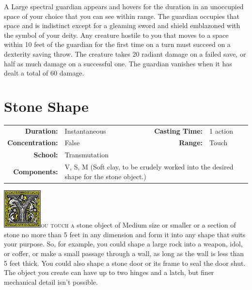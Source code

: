 \documentclass[12pt,showtrims]{memoir}
\begin{document}
\vspace{1\baselineskip}\noindent A Large spectral guardian appears and hovers for the duration in an unoccupied space of your choice that you can see within range. The guardian occupies that space and is indistinct except for a gleaming sword and shield emblazoned with the symbol of your deity. Any creature hostile to you that moves to a space within 10 feet of the guardian for the first time on a turn must succeed on a dexterity saving throw. The creature takes 20 radiant damage on a failed save, or half as much damage on a successful one. The guardian vanishes when it has dealt a total of 60 damage.

\newpage
\section*{Stone Shape}

{
\small\centering\vspace{-6pt}
\begin{tabular}{rlrl}
\toprule

\textbf{Duration:} & Instantaneous &
\textbf{Casting Time:} & 1 action \\
\textbf{Concentration:} & False &
\textbf{Range:} & Touch \\
\textbf{School:} & Transmutation \\
\textbf{Components:} & \multicolumn{3}{p{0.7\textwidth}}{V, S, M (Soft clay, to be crudely worked into the desired shape for the stone object.)}\\

\bottomrule
\end{tabular}
}

\vspace{1\baselineskip}\noindent 
\lettrine[lines=4]{\includegraphics[height=58pt]{initials/Y.png}}{ou touch a} stone object of Medium size or smaller or a section of stone no more than 5 feet in any dimension and form it into any shape that suits your purpose. So, for example, you could shape a large rock into a weapon, idol, or coffer, or make a small passage through a wall, as long as the wall is less than 5 feet thick. You could also shape a stone door or its frame to seal the door shut. The object you create can have up to two hinges and a latch, but finer mechanical detail isn't possible.
\end{document}
